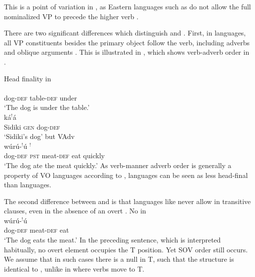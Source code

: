\documentclass[output=paper]{LSP/langsci}
\begin{document}
This is a point of variation in , as Eastern  languages such as  do not allow the full nominalized VP to precede the higher verb \citep{nikitina09}.

There are two significant differences which distinguish  and . First, in  languages, all VP constituents besides the primary object follow the verb, including adverbs and oblique arguments \citep{nikitina09}. This is illustrated in , which shows verb-adverb order in .

\ea Head finality in  \label{ex:8:dafing}
 \\
\gll {} \textbf{} \textbf{} \\
dog-\textsc{def} table-\textsc{def} under \\
\glt  `The dog is under the table.'  \label{ex:8a:dafing}
\\
\gll \textbf{} k\'a$^!$\'a \textbf{} \\
Sidiki \textsc{gen} dog-\textsc{def} \\
\glt `Sidiki's dog' \label{ex:8b:dafing}
\ex but {VAdv}\\
\gll w\'ur\'u-$^!$\'u {$^!$}  \textbf{} \textbf{} \\
{dog}-\textsc{def} \textsc{pst} meat-\textsc{def} eat quickly\\
\glt `The dog ate the meat quickly.' \label{ex:8c:dafing}
\z
\z
As verb-manner adverb order is generally a property of VO languages according to \citet{dryer07},  languages can be seen as less head-final than  languages.

The second difference between  and  is that  languages like  never allow  in transitive clauses, even in the absence of an overt . %
\ea No  in \\
\gll w\'ur\'u-$^!$\'u {}  \textbf{} \\
{dog}-\textsc{def} {} meat-\textsc{def} eat\\
\glt `The dog eats the meat.'
\z
In the preceding sentence, which is interpreted habitually, no overt  element occupies the T position. Yet SOV order still occurs. We assume that in such cases there is a null  in T, such that the structure is identical to , unlike in  where verbs move to T.
\end{document}
